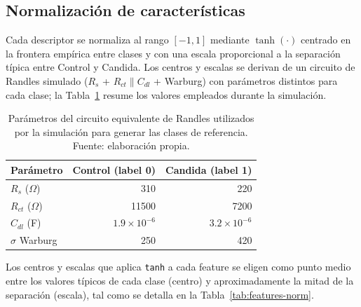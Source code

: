 \documentclass[11pt,a4paper,spanish]{book}
\begin{document}
\subsection{Normalizaci\'{o}n de caracter\'{i}sticas}

Cada descriptor se normaliza al rango $[-1, 1]$ mediante $\tanh(\cdot)$ centrado en la frontera emp\'{i}rica entre clases y con una escala proporcional a la separaci\'{o}n t\'{i}pica entre Control y Candida. Los centros y escalas se derivan de un circuito de Randles simulado ($R_s$ + $R_{ct} \parallel C_{dl}$ + Warburg) con par\'{a}metros distintos para cada clase; la Tabla~\ref{tab:randles-params} resume los valores empleados durante la simulaci\'{o}n.

\begin{table}[ht]
	\centering
	\begin{tabular}{l r r}
		\hline\hline
		Par\'{a}metro     & Control (label 0) & Candida (label 1) \\ [0.5ex]
		\hline
		$R_s$ ($\Omega$)  & 310               & 220               \\
		$R_{ct}$ ($\Omega$) & 11500           & 7200              \\
		$C_{dl}$ (F)      & $1.9\times 10^{-6}$ & $3.2\times 10^{-6}$ \\
		$\sigma$ Warburg  & 250               & 420               \\
		\hline
	\end{tabular}
	\caption[Par\'{a}metros de Randles por clase]{Par\'{a}metros del circuito equivalente de Randles utilizados por la simulaci\'{o}n para generar las clases de referencia. Fuente: elaboraci\'{o}n propia.}
	\label{tab:randles-params}
\end{table}

Los centros y escalas que aplica \texttt{tanh} a cada feature se eligen como punto medio entre los valores t\'{i}picos de cada clase (centro) y aproximadamente la mitad de la separaci\'{o}n (escala), tal como se detalla en la Tabla~\ref{tab:features-norm}.
\end{document}

